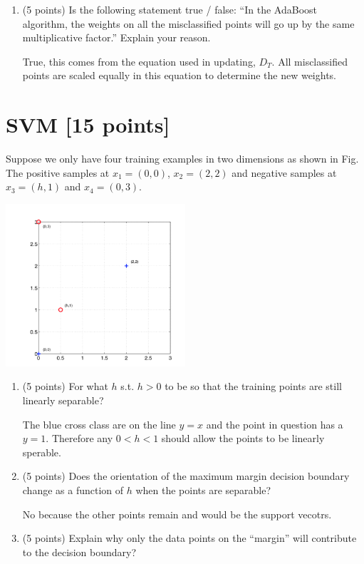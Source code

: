 \documentclass[a4paper,12pt,fleqn]{article}
\begin{document}
\begin{enumerate}
\vspace{.15in}

\item (5 points) Is the following statement true / false: ``In the AdaBoost algorithm, the weights on all the
misclassified points will go up by the same multiplicative factor.'' Explain your reason.

\vspace{.15in}
True, this comes from the equation used in updating, $D_T$.  All misclassified points are scaled equally in this equation to determine the new weights.
\vspace{.15in}

\end{enumerate}


\clearpage
\section{SVM [15 points]}

Suppose we only have four training examples in two dimensions as shown in Fig. The positive samples at $x_1 = (0, 0)$, $x_2 = (2, 2)$ and negative samples at $x_3 = (h, 1)$ and $x_4 = (0, 3)$. 
%
\begin{center}
\includegraphics[width = 0.5\textwidth]{svm}
\end{center}

\begin{enumerate}
\item (5 points) For what $h$ s.t. $h > 0$ to be so that the training points are still linearly separable?

\vspace{.15in}
The blue cross class are on the line $y=x$ and the point in question has a $y=1$.  Therefore any $0 < h < 1$ should allow the points to be linearly sperable.
\vspace{.15in}

\item (5 points) Does the orientation of the maximum margin decision boundary change as a function of $h$ when the points are separable?

\vspace{.15in}
No because the other points remain and would be the support vecotrs.  
\vspace{.15in}

\item (5 points) Explain why only the data points on the ``margin'' will contribute to the decision boundary?
\end{enumerate}
\end{document}
